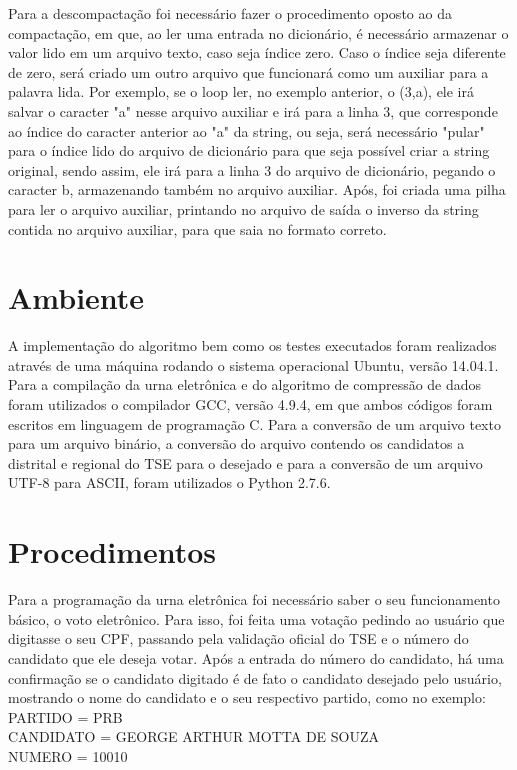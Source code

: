 \documentclass[
	article,			
	11pt,				
	oneside,			
	a4paper,			
	english,			
	brazil,				
	sumario=tradicional
	]{abntex2}
\newenvironment{myfont}{\fontfamily{pcr}\selectfont}{\par}
\begin{document}
Para a descompactação foi necessário fazer o procedimento oposto ao da compactação, em que, ao ler uma entrada no dicionário, é necessário armazenar o valor lido em um arquivo texto, caso seja índice zero. Caso o índice seja diferente de zero, será criado um outro arquivo que funcionará como um auxiliar para a palavra lida. Por exemplo, se o loop ler, no exemplo anterior, o (3,a), ele irá salvar o caracter "a" nesse arquivo auxiliar e irá para a linha 3, que corresponde ao índice do caracter anterior ao "a" da string, ou seja, será necessário "pular" para o índice lido do arquivo de dicionário para que seja possível criar a string original, sendo assim, ele irá para a linha 3 do arquivo de dicionário, pegando o caracter b, armazenando também no arquivo auxiliar. Após, foi criada uma pilha para ler o arquivo auxiliar, printando no arquivo de saída o inverso da string contida no arquivo auxiliar, para que saia no formato correto. 

\section{Ambiente}

A implementação do algoritmo bem como os testes executados foram realizados através de uma máquina rodando o sistema operacional Ubuntu, versão 14.04.1. Para a compilação da urna eletrônica e do algoritmo de compressão de dados foram utilizados o compilador GCC, versão 4.9.4, em que ambos códigos foram escritos em linguagem de programação C. Para a conversão de um arquivo texto para um arquivo binário, a conversão do arquivo contendo os candidatos a distrital e regional do TSE para o desejado e para a conversão de um arquivo UTF-8 para ASCII, foram utilizados o Python 2.7.6.

\section{Procedimentos}

Para a programação da urna eletrônica foi necessário saber o seu funcionamento básico, o voto eletrônico. Para isso, foi feita uma votação pedindo ao usuário que digitasse o seu CPF, passando pela validação oficial do TSE e o número do candidato que ele deseja votar. Após a entrada do número do candidato, há uma confirmação se o candidato digitado é de fato o candidato desejado pelo usuário, mostrando o nome do candidato e o seu respectivo partido, como no exemplo: \\
\newline
\begin{myfont}
{\footnotesize PARTIDO = PRB}\\
{\footnotesize CANDIDATO = GEORGE ARTHUR MOTTA DE SOUZA}\\
{\footnotesize NUMERO = 10010}\\
\end{myfont}
\end{document}
